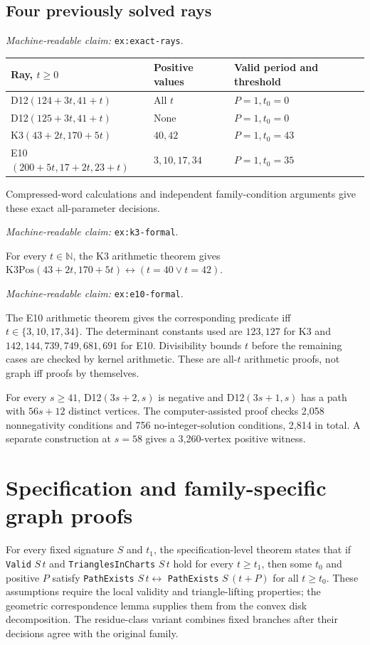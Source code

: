 \documentclass[11pt]{amsart}
\newcommand{\N}{\mathbb N}
\newcommand{\record}[1]{\nolinkurl{#1}}
\newcommand{\claimid}[1]{\par\nopagebreak\noindent\textit{Machine-readable claim:} \record{#1}.\par}
\theoremstyle{definition}\newtheorem{definition}{Definition}
\begin{document}
\subsection{Four previously solved rays}\label{ex:exact-rays}
\claimid{ex:exact-rays}
\begin{center}
\begin{tabular}{lll}\toprule
Ray, $t\ge0$ & Positive values & Valid period and threshold\\\midrule
D12$(124+3t,41+t)$ & All $t$ & $P=1,t_0=0$\\
D12$(125+3t,41+t)$ & None & $P=1,t_0=0$\\
K3$(43+2t,170+5t)$ & $40,42$ & $P=1,t_0=43$\\
E10$(200+5t,17+2t,23+t)$ & $3,10,17,34$ & $P=1,t_0=35$\\\bottomrule
\end{tabular}
\end{center}
Compressed-word calculations and independent family-condition
arguments give these exact all-parameter decisions.
\label{ex:k3-formal}\claimid{ex:k3-formal}
For every $t\in\N$, the K3 arithmetic theorem gives
$\mathrm{K3Pos}(43+2t,170+5t)\leftrightarrow(t=40\lor t=42)$.
\label{ex:e10-formal}\claimid{ex:e10-formal}
The E10 arithmetic theorem gives the corresponding predicate
iff $t\in\{3,10,17,34\}$. The determinant constants used are
$123,127$ for K3 and $142,144,739,749,681,691$ for E10. Divisibility
bounds $t$ before the remaining cases are checked by kernel arithmetic.
These are all-$t$ arithmetic proofs, not graph iff proofs by themselves.

For every $s\ge41$, D12$(3s+2,s)$ is negative and
D12$(3s+1,s)$ has a path with $56s+12$ distinct vertices. The
computer-assisted proof checks 2,058 nonnegativity conditions and
756 no-integer-solution conditions, 2,814 in total. A separate
construction at $s=58$ gives a 3,260-vertex positive witness.

\section{Specification and family-specific graph proofs}\label{sec:formal}
For every fixed signature $S$ and $t_1$, the specification-level
theorem states that if \record{Valid} $S\,t$ and
\record{TrianglesInCharts} $S\,t$ hold for every $t\ge t_1$, then
some $t_0$ and positive $P$ satisfy
\record{PathExists} $S\,t\leftrightarrow$
\record{PathExists} $S\,(t+P)$ for all $t\ge t_0$.
These assumptions require the local validity and triangle-lifting
properties; the geometric correspondence lemma supplies them from
the convex disk decomposition. The residue-class variant combines
fixed branches after their decisions agree with the original family.
\end{document}

